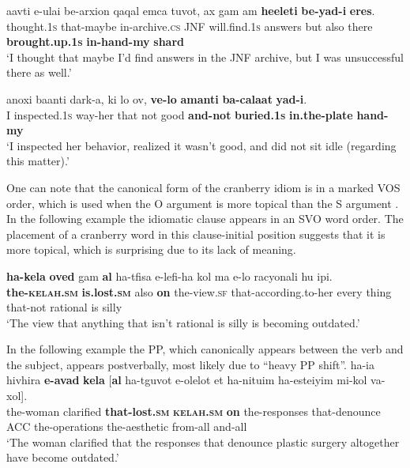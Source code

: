 \documentclass[output=paper]{langsci/langscibook}
\begin{document}
	\ea\label{xeres-order}
    	\gll {\het}a{\shin}avti {\shin}e-{\alef}ulai be-{\alef}arxion qaqal {\alef}emca t{\shin}uvot, {\alef}ax gam {\shin}am \textbf{he{\ayin}eleti} \textbf{be-yad-i} \textbf{{\het}eres}.\\
    	   thought.\textsc{1s} that-maybe in-archive.\textsc{cs} JNF will.find.\textsc{1s} answers but also there \textbf{brought.up.\textsc{1s}} \textbf{in-hand-my} \textbf{shard}\\
    	\glt `I thought that maybe I'd find answers in the JNF archive, but I was unsuccessful there as well.'
	\z

	\ea\label{taman-order}
    	\gll {\alef}anoxi ba{\het}anti dark-a, ki lo {\tet}ov, \textbf{ve-lo} \textbf{{\tet}amanti} \textbf{ba-cala{\het}at} \textbf{yad-i}.\\
    	   I inspected.\textsc{1s} way-her that not good \textbf{and-not} \textbf{buried.\textsc{1s}} \textbf{in.the-plate} \textbf{hand-my}\\
    	\glt `I inspected her behavior, realized it wasn't good, and did not sit idle (regarding this matter).'
	\z

One can note that the canonical form of the cranberry idiom  is in a marked VOS order, which is used when the O argument is more topical than the S argument \citep{melnik16}. In the following example the idiomatic clause appears in an SVO word order. The placement of a cranberry word in this clause-initial position suggests that it is more topical, which is surprising due to its lack of meaning.

    \ea\label{kelax-top}
         \gll \textbf{ha-kela{\het}} \textbf{{\alef}oved} gam \textbf{{\ayin}al} ha-tfisa {\shin}e-lefi-ha kol ma {\shin}e-lo racyonali hu {\tet}ip{\shin}i.\\
             \textbf{the-\textsc{kelah}.\textsc{sm}} \textbf{is.lost.\textsc{sm}} also \textbf{on} the-view.\textsc{sf} that-according.to-her every thing that-not rational is silly\\
        \glt `The view that anything that isn't rational is silly is becoming outdated.'
    \z


In the following example the PP, which canonically appears between the verb and the subject, appears postverbally, most likely due to ``heavy PP shift''.
    \ea\label{kelax-order}
        \gll ha-{\alef}i{\shin}a hivhira \textbf{{\shin}e-{\alef}avad} \textbf{kela{\het}} [\textbf{{\ayin}al} ha-tguvot {\shin}e-{\shin}olelot {\alef}et ha-nitu{\het}im ha-{\alef}este{\tet}iyim mi-kol va-xol].\\
            the-woman clarified \textbf{that-lost.\textsc{sm}} \textbf{\textsc{kelah}.\textsc{sm}} \textbf{on} the-responses that-denounce ACC the-operations the-aesthetic from-all and-all\\
        \glt `The woman clarified that the responses that denounce plastic surgery altogether have become outdated.'
    \z
\end{document}
